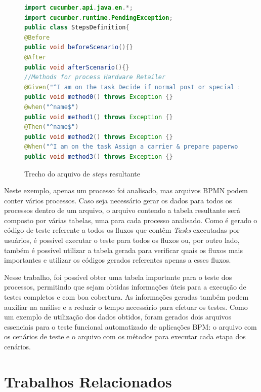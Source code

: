\documentclass[12pt]{article}
\begin{document}
\begin{figure}[ht]
\centering
\begin{lstlisting}[language=Java,frame=single,basicstyle=\footnotesize\ttfamily]
import cucumber.api.java.en.*;
import cucumber.runtime.PendingException;
public class StepsDefinition{
@Before
public void beforeScenario(){}
@After
public void afterScenario(){} 
//Methods for process Hardware Retailer
@Given("^I am on the task Decide if normal post or special shipment$") 
public void method0() throws Exception {} 
@when("^name$") 
public void method1() throws Exception {} 
@Then("^name$") 
public void method2() throws Exception {} 
@When("^I am on the task Assign a carrier & prepare paperwork$") 
public void method3() throws Exception {} 
\end{lstlisting}
\caption{Trecho do arquivo de \emph{steps} resultante}
\label{fig:codigojava}
\end{figure}

Neste exemplo, apenas um processo foi analisado, mas arquivos BPMN podem conter vários processos. Caso seja necessário gerar os dados para todos os processos dentro de um arquivo, o arquivo contendo a tabela resultante será composto por várias tabelas, uma para cada processo analisado. Como é gerado o código de teste referente a todos os fluxos que contêm \emph{Tasks} executadas por usuários, é possível executar o teste para todos os fluxos ou, por outro lado, também é possível utilizar a tabela gerada para verificar quais os fluxos mais importantes e utilizar os códigos gerados referentes apenas a esses fluxos.

Nesse trabalho, foi possível obter uma tabela importante para o teste dos processos, permitindo que sejam obtidas informações úteis para a execução de testes completos e com boa cobertura. As informações geradas também podem auxiliar na análise e a reduzir o tempo necessário para efetuar os testes. Como um exemplo de utilização dos dados obtidos, foram gerados dois arquivos essenciais para o teste funcional automatizado de aplicações BPM: o arquivo com os cenários de teste e o arquivo com os métodos para executar cada etapa dos cenários. %


\section{Trabalhos Relacionados}
\end{document}
